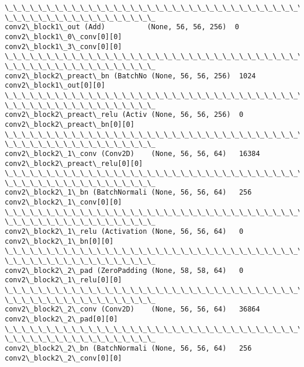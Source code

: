 \documentclass[11pt]{article}
\begin{document}
\begin{Verbatim}[commandchars=\\\{\}]
\_\_\_\_\_\_\_\_\_\_\_\_\_\_\_\_\_\_\_\_\_\_\_\_\_\_\_\_\_\_\_\_\_\_\_\_\_\_\_\_\_\_\_\_\_\_\_\_\_\_\_\_\_\_\_\_\_\_\_\_\_\_\_\_\_\_\_\_\_\_\_\_\_\_\_\_\_\_\_\_
\_\_\_\_\_\_\_\_\_\_\_\_\_\_\_\_\_\_
conv2\_block1\_out (Add)          (None, 56, 56, 256)  0
conv2\_block1\_0\_conv[0][0]
conv2\_block1\_3\_conv[0][0]
\_\_\_\_\_\_\_\_\_\_\_\_\_\_\_\_\_\_\_\_\_\_\_\_\_\_\_\_\_\_\_\_\_\_\_\_\_\_\_\_\_\_\_\_\_\_\_\_\_\_\_\_\_\_\_\_\_\_\_\_\_\_\_\_\_\_\_\_\_\_\_\_\_\_\_\_\_\_\_\_
\_\_\_\_\_\_\_\_\_\_\_\_\_\_\_\_\_\_
conv2\_block2\_preact\_bn (BatchNo (None, 56, 56, 256)  1024
conv2\_block1\_out[0][0]
\_\_\_\_\_\_\_\_\_\_\_\_\_\_\_\_\_\_\_\_\_\_\_\_\_\_\_\_\_\_\_\_\_\_\_\_\_\_\_\_\_\_\_\_\_\_\_\_\_\_\_\_\_\_\_\_\_\_\_\_\_\_\_\_\_\_\_\_\_\_\_\_\_\_\_\_\_\_\_\_
\_\_\_\_\_\_\_\_\_\_\_\_\_\_\_\_\_\_
conv2\_block2\_preact\_relu (Activ (None, 56, 56, 256)  0
conv2\_block2\_preact\_bn[0][0]
\_\_\_\_\_\_\_\_\_\_\_\_\_\_\_\_\_\_\_\_\_\_\_\_\_\_\_\_\_\_\_\_\_\_\_\_\_\_\_\_\_\_\_\_\_\_\_\_\_\_\_\_\_\_\_\_\_\_\_\_\_\_\_\_\_\_\_\_\_\_\_\_\_\_\_\_\_\_\_\_
\_\_\_\_\_\_\_\_\_\_\_\_\_\_\_\_\_\_
conv2\_block2\_1\_conv (Conv2D)    (None, 56, 56, 64)   16384
conv2\_block2\_preact\_relu[0][0]
\_\_\_\_\_\_\_\_\_\_\_\_\_\_\_\_\_\_\_\_\_\_\_\_\_\_\_\_\_\_\_\_\_\_\_\_\_\_\_\_\_\_\_\_\_\_\_\_\_\_\_\_\_\_\_\_\_\_\_\_\_\_\_\_\_\_\_\_\_\_\_\_\_\_\_\_\_\_\_\_
\_\_\_\_\_\_\_\_\_\_\_\_\_\_\_\_\_\_
conv2\_block2\_1\_bn (BatchNormali (None, 56, 56, 64)   256
conv2\_block2\_1\_conv[0][0]
\_\_\_\_\_\_\_\_\_\_\_\_\_\_\_\_\_\_\_\_\_\_\_\_\_\_\_\_\_\_\_\_\_\_\_\_\_\_\_\_\_\_\_\_\_\_\_\_\_\_\_\_\_\_\_\_\_\_\_\_\_\_\_\_\_\_\_\_\_\_\_\_\_\_\_\_\_\_\_\_
\_\_\_\_\_\_\_\_\_\_\_\_\_\_\_\_\_\_
conv2\_block2\_1\_relu (Activation (None, 56, 56, 64)   0
conv2\_block2\_1\_bn[0][0]
\_\_\_\_\_\_\_\_\_\_\_\_\_\_\_\_\_\_\_\_\_\_\_\_\_\_\_\_\_\_\_\_\_\_\_\_\_\_\_\_\_\_\_\_\_\_\_\_\_\_\_\_\_\_\_\_\_\_\_\_\_\_\_\_\_\_\_\_\_\_\_\_\_\_\_\_\_\_\_\_
\_\_\_\_\_\_\_\_\_\_\_\_\_\_\_\_\_\_
conv2\_block2\_2\_pad (ZeroPadding (None, 58, 58, 64)   0
conv2\_block2\_1\_relu[0][0]
\_\_\_\_\_\_\_\_\_\_\_\_\_\_\_\_\_\_\_\_\_\_\_\_\_\_\_\_\_\_\_\_\_\_\_\_\_\_\_\_\_\_\_\_\_\_\_\_\_\_\_\_\_\_\_\_\_\_\_\_\_\_\_\_\_\_\_\_\_\_\_\_\_\_\_\_\_\_\_\_
\_\_\_\_\_\_\_\_\_\_\_\_\_\_\_\_\_\_
conv2\_block2\_2\_conv (Conv2D)    (None, 56, 56, 64)   36864
conv2\_block2\_2\_pad[0][0]
\_\_\_\_\_\_\_\_\_\_\_\_\_\_\_\_\_\_\_\_\_\_\_\_\_\_\_\_\_\_\_\_\_\_\_\_\_\_\_\_\_\_\_\_\_\_\_\_\_\_\_\_\_\_\_\_\_\_\_\_\_\_\_\_\_\_\_\_\_\_\_\_\_\_\_\_\_\_\_\_
\_\_\_\_\_\_\_\_\_\_\_\_\_\_\_\_\_\_
conv2\_block2\_2\_bn (BatchNormali (None, 56, 56, 64)   256
conv2\_block2\_2\_conv[0][0]

\end{Verbatim}
\end{document}
